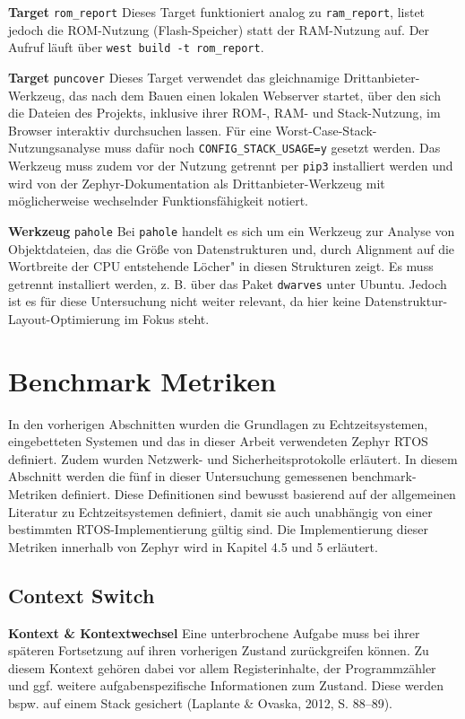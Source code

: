 \textbf{Target }\lstinline[style=codeinline]|rom_report| Dieses Target funktioniert analog zu \lstinline[style=codeinline]|ram_report|, listet jedoch die ROM-Nutzung (Flash-Speicher) statt der RAM-Nutzung auf. Der Aufruf l{\"a}uft {\"u}ber \lstinline[style=codeinline]|west build -t rom_report|.

\textbf{Target }\lstinline[style=codeinline]|puncover| Dieses Target verwendet das gleichnamige Drittanbieter-Werkzeug, das nach dem Bauen einen lokalen Webserver startet, {\"u}ber den sich die Dateien des Projekts, inklusive ihrer ROM-, RAM- und Stack-Nutzung, im Browser interaktiv durchsuchen lassen. F{\"u}r eine Worst-Case-Stack-Nutzungsanalyse muss daf{\"u}r noch \lstinline[style=codeinline]|CONFIG_STACK_USAGE=y| gesetzt werden. Das Werkzeug muss zudem vor der Nutzung getrennt per \lstinline[style=codeinline]|pip3| installiert werden und wird von der Zephyr-Dokumentation als Drittanbieter-Werkzeug mit m{\"o}glicherweise wechselnder Funktionsf{\"a}higkeit notiert.

\textbf{Werkzeug }\lstinline[style=codeinline]|pahole|\textbf{ }Bei \lstinline[style=codeinline]|pahole| handelt es sich um ein Werkzeug zur Analyse von Objektdateien, das die Gr{\"o}{\ss}e von Datenstrukturen und, durch Alignment auf die Wortbreite der CPU entstehende \glqq{}L{\"o}cher" in diesen Strukturen zeigt. Es muss getrennt installiert werden, z. B. {\"u}ber das Paket \lstinline[style=codeinline]|dwarves| unter Ubuntu. Jedoch ist es f{\"u}r diese Untersuchung nicht weiter relevant, da hier keine Datenstruktur-Layout-Optimierung im Fokus steht.

\section{Benchmark Metriken}
In den vorherigen Abschnitten wurden die Grundlagen zu Echtzeitsystemen, eingebetteten Systemen und das in dieser Arbeit verwendeten Zephyr RTOS definiert. Zudem wurden Netzwerk- und Sicherheitsprotokolle erl{\"a}utert. In diesem Abschnitt werden die f{\"u}nf in dieser Untersuchung gemessenen benchmark-Metriken definiert. Diese Definitionen sind bewusst basierend auf der allgemeinen Literatur zu Echtzeitsystemen definiert, damit sie auch unabh{\"a}ngig von einer bestimmten RTOS-Implementierung g{\"u}ltig sind. Die Implementierung dieser Metriken innerhalb von Zephyr wird in Kapitel 4.5 und 5 erl{\"a}utert.

\subsection{Context Switch}
\textbf{Kontext \& Kontextwechsel }Eine unterbrochene Aufgabe muss bei ihrer sp{\"a}teren Fortsetzung auf ihren vorherigen Zustand zur{\"u}ckgreifen k{\"o}nnen. Zu diesem Kontext geh{\"o}ren dabei vor allem Registerinhalte, der Programmz{\"a}hler und ggf. weitere aufgabenspezifische Informationen zum Zustand. Diese werden bspw. auf einem Stack gesichert (Laplante \& Ovaska, 2012, S. 88--89).

